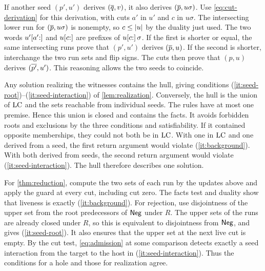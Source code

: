 If another seed $(p',u')$ derives $(\overline{q},v)$, it also derives
$(\overline{p},u\sigma)$. Use \eqref{eq:cut-derivation} for this
derivation, with cuts $a'$ in $u'$ and $c$ in $u\sigma$. The intersecting
lower run for $(\overline{p},u\sigma)$ is nonempty, so $c\le\lvert u\rvert$ by
the duality just used. The two words $u'[a'{:}]$ and $u[c{:}]$
are prefixes of $u[c{:}]\,\sigma$. If the first is shorter or equal,
the same intersecting runs prove that $(p',u')$ derives $(\overline{p},u)$.
If the second is shorter, interchange the two run sets and flip
signs. The cuts then prove that $(p,u)$ derives $(\overline{p'},u')$.
This reasoning allows the two seeds to coincide.

Any solution realizing the witnesses contains the hull, giving
conditions (\ref{it:seed-root})--(\ref{it:seed-interaction}) of
\cref{lem:realization}. Conversely, the hull is the union of $\mathrm{LC}$ and
the sets reachable from individual seeds. The rules have at most one
premise. Hence this union is closed and contains the facts. It avoids
forbidden roots and exclusions by the three conditions and
satisfiability. If it contained opposite memberships, they could not
both be in $\mathrm{LC}$. With one in $\mathrm{LC}$ and one derived from a seed, the
first return argument would violate (\ref{it:background}). With both
derived from seeds, the second return argument would violate
(\ref{it:seed-interaction}). The hull therefore describes one solution.

For \cref{thm:reduction}, compute the two sets of each run by the
updates above and apply the guard at every cut, including cut zero.
The facts test and duality show that liveness is exactly
(\ref{it:background}). For rejection, use disjointness of the upper
set from the root predecessors of $\mathsf{Neg}$ under $R$. The upper
sets of the runs are already closed under $R$, so this is equivalent
to disjointness from $\mathsf{Neg}$, and gives (\ref{it:seed-root}). It also
ensures that the upper set at the next live cut is empty. By the
cut test, \eqref{eq:admission} at some comparison detects exactly
a seed interaction from the target to the host in
(\ref{it:seed-interaction}). Thus the conditions for a hole and
those for realization agree.
